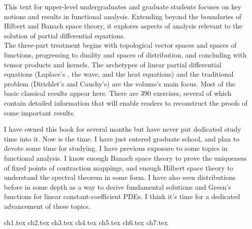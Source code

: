 \documentclass{../booknotes}
\begin{document}
	\maketitle

	\begin{pubdescrip}
		This text for upper-level undergraduates and graduate students focuses on key notions and results in functional analysis. Extending beyond the boundaries of Hilbert and Banach space theory, it explores aspects of analysis relevant to the solution of partial differential equations. \\
		\indent The three-part treatment begins with topological vector spaces and spaces of functions, progressing to duality and spaces of distribution, and concluding with tensor products and kernels. The archetypes of linear partial differential equations (Laplace's , the wave, and the heat equations) and the traditional problem (Dirichlet's and Cauchy's) are the volume's main focus. Most of the basic classical results appear here. There are 390 exercises, several of which contain detailed information that will enable readers to reconstruct the proofs of some important results.
	\end{pubdescrip}

	\begin{transcribernote}
		\indent I have owned this book for several months but have never put dedicated study time into it. Now is the time. I have just entered graduate school, and plan to devote some time for studying. I have previous exposure to some topics in functional analysis. I know enough Banach space theory to prove the uniqueness of fixed points of contraction mappings, and enough Hilbert space theory to understand the spectral theorem in some form. I have also seen distributions before in some depth as a way to derive fundamental solutions and Green's functions for linear constant-coefficient PDEs. I think it's time for a dedicated advancement of these topics.
	\end{transcribernote}
	
	{ch1.tex}
	{ch2.tex}
	{ch3.tex}
	{ch4.tex}
	{ch5.tex}
	{ch6.tex}
	{ch7.tex}
	
\end{document}
